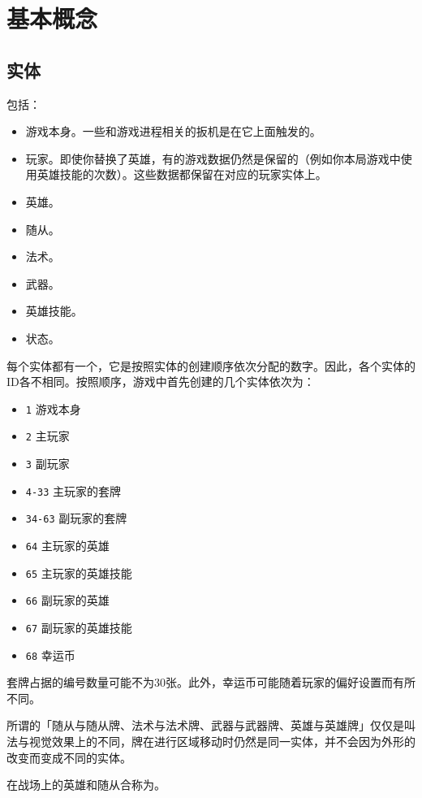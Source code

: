 \chapter{基本概念}
\label{basic-concept}

\section{实体}
\label{entity}

包括：
\begin{itemize}
    \item 游戏本身。一些和游戏进程相关的扳机是在它上面触发的。
    \item 玩家。即使你替换了英雄，有的游戏数据仍然是保留的（例如你本局游戏中使用英雄技能的次数）。这些数据都保留在对应的玩家实体上。
    \item 英雄。
    \item 随从。
    \item 法术。
    \item 武器。
    \item 英雄技能。
    \item 状态。
\end{itemize}

每个实体都有一个，它是按照实体的创建顺序依次分配的数字。因此，各个实体的ID各不相同。按照顺序，游戏中首先创建的几个实体依次为：
\begin{itemize}
    \item \texttt{1} 游戏本身
    \item \texttt{2} 主玩家
    \item \texttt{3} 副玩家
    \item \texttt{4-33} 主玩家的套牌
    \item \texttt{34-63} 副玩家的套牌
    \item \texttt{64} 主玩家的英雄
    \item \texttt{65} 主玩家的英雄技能
    \item \texttt{66} 副玩家的英雄
    \item \texttt{67} 副玩家的英雄技能
    \item \texttt{68} 幸运币
\end{itemize}
套牌占据的编号数量可能不为30张。此外，幸运币可能随着玩家的偏好设置而有所不同。

\notice 所谓的「随从与随从牌、法术与法术牌、武器与武器牌、英雄与英雄牌」仅仅是叫法与视觉效果上的不同，牌在进行区域移动时仍然是同一实体，并不会因为外形的改变而变成不同的实体。

在战场上的英雄和随从合称为。

